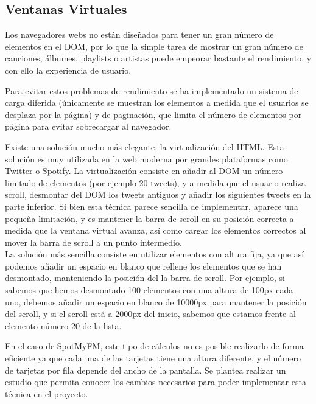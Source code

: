 \subsection{Ventanas Virtuales}
Los navegadores webs no están diseñados para tener un gran número de elementos en el DOM, por lo que la simple tarea de mostrar un gran número de canciones, álbumes, playlists o artistas  puede empeorar bastante el rendimiento, y con ello la experiencia de usuario. 

Para evitar estos problemas de rendimiento se ha implementado un sistema de carga diferida (únicamente se muestran los elementos a medida que el usuarios se desplaza por la página) y de paginación, que limita el número de elementos por página para evitar sobrecargar al navegador. 

Existe una solución mucho más elegante, la virtualización del HTML. Esta solución es muy utilizada en la web moderna por grandes plataformas como Twitter o Spotify. La virtualización consiste en añadir al DOM un número limitado de elementos (por ejemplo 20 tweets), y a medida que el usuario realiza scroll, desmontar del DOM los tweets antiguos y añadir los siguientes tweets en la parte inferior.
Si bien esta técnica parece sencilla de implementar, aparece una pequeña limitación, y es mantener la barra de scroll en su posición correcta a medida que la ventana virtual avanza, así como cargar los elementos correctos al mover la barra de scroll a un punto intermedio.\\
La solución más sencilla consiste en utilizar elementos con altura fija, ya que así podemos añadir un espacio en blanco que rellene los elementos que se han desmontado, manteniendo la posición del la barra de scroll. Por ejemplo, si sabemos que hemos desmontado 100 elementos con una altura de 100px cada uno, debemos añadir un espacio en blanco de 10000px para mantener la posición del scroll, y si el scroll está a 2000px del inicio, sabemos que estamos frente al elemento número 20 de la lista.

En el caso de SpotMyFM, este tipo de cálculos no es posible realizarlo de forma eficiente ya que cada una de las tarjetas tiene una altura diferente, y el número de tarjetas por fila depende del ancho de la pantalla.
Se plantea realizar un estudio que permita conocer los cambios necesarios para poder implementar esta técnica en el proyecto. 

